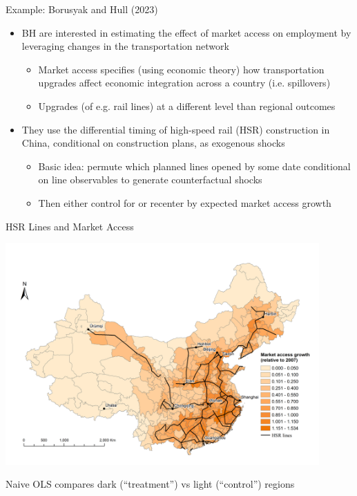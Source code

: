 \documentclass[11pt,english]{beamer}
\begin{document}
\begin{frame}{Example: Borusyak and Hull (2023)}
\begin{itemize}
\item BH are interested in estimating the effect of market access on employment by leveraging changes in the transportation network\smallskip
\begin{itemize}
\item Market access specifies (using economic theory) how transportation upgrades affect economic integration across a country (i.e. spillovers)\smallskip\pause{}
\item Upgrades (of e.g. rail lines) at a different level than regional outcomes
\end{itemize}\bigskip\pause{}
\item They use the differential timing of high-speed rail (HSR) construction in China, conditional on construction plans, as exogenous shocks\smallskip\pause{}
\begin{itemize}
\item Basic idea: permute which planned lines opened by some date conditional on line observables to generate counterfactual shocks\smallskip\pause{}
\item Then either control for or recenter by expected market access growth
\end{itemize}
\end{itemize}
\end{frame}

\begin{frame}{HSR Lines and Market Access}

\begin{center}
	\includegraphics[width=0.9\textwidth]{figures/Line_panel2016.png}
\end{center}

Naive OLS compares dark (``treatment'') vs light (``control'') regions

\end{frame}
\end{document}
